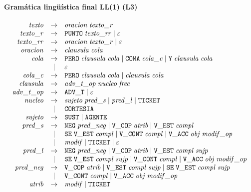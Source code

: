 \paragraph{Gramática lingüística final LL(1) (L3)}
\[
\begin{array}{rcl}
  \mathit{texto} & \to & \mathit{oracion}\;\mathit{texto\_r} \\
  \mathit{texto\_r} & \to & \mathtt{PUNTO}\;\mathit{texto\_rr} \mid \varepsilon \\
  \mathit{texto\_rr} & \to & \mathit{oracion}\;\mathit{texto\_r} \mid \varepsilon \\
  \mathit{oracion} & \to & \mathit{clausula}\;\mathit{cola} \\
  \mathit{cola} & \to & \mathtt{PERO}\;\mathit{clausula}\;\mathit{cola} \mid \mathtt{COMA}\;\mathit{cola\_c} \mid \mathtt{Y}\;\mathit{clausula}\;\mathit{cola} \\
   & \mid & \varepsilon \\
  \mathit{cola\_c} & \to & \mathtt{PERO}\;\mathit{clausula}\;\mathit{cola} \mid \mathit{clausula}\;\mathit{cola} \\
  \mathit{clausula} & \to & \mathit{adv\_t\_op}\;\mathit{nucleo}\;\mathit{frec} \\
  \mathit{adv\_t\_op} & \to & \mathtt{ADV\_T} \mid \varepsilon \\
  \mathit{nucleo} & \to & \mathit{sujeto}\;\mathit{pred\_s} \mid \mathit{pred\_l} \mid \mathtt{TICKET} \\
   & \mid & \mathtt{CORTESIA} \\
  \mathit{sujeto} & \to & \mathtt{SUST} \mid \mathtt{AGENTE} \\
  \mathit{pred\_s} & \to & \mathtt{NEG}\;\mathit{pred\_neg} \mid \mathtt{V\_COP}\;\mathit{atrib} \mid \mathtt{V\_EST}\;\mathit{compl} \\
   & \mid & \mathtt{SE}\;\mathtt{V\_EST}\;\mathit{compl} \mid \mathtt{V\_CONT}\;\mathit{compl} \mid \mathtt{V\_ACC}\;\mathit{obj}\;\mathit{modif\_op} \\
   & \mid & \mathit{modif} \mid \mathtt{TICKET} \mid \varepsilon \\
  \mathit{pred\_l} & \to & \mathtt{NEG}\;\mathit{pred\_neg} \mid \mathtt{V\_COP}\;\mathit{atrib} \mid \mathtt{V\_EST}\;\mathit{compl}\;\mathit{sujp} \\
   & \mid & \mathtt{SE}\;\mathtt{V\_EST}\;\mathit{compl}\;\mathit{sujp} \mid \mathtt{V\_CONT}\;\mathit{compl} \mid \mathtt{V\_ACC}\;\mathit{obj}\;\mathit{modif\_op} \\
  \mathit{pred\_neg} & \to & \mathtt{V\_COP}\;\mathit{atrib} \mid \mathtt{V\_EST}\;\mathit{compl}\;\mathit{sujp} \mid \mathtt{SE}\;\mathtt{V\_EST}\;\mathit{compl}\;\mathit{sujp} \\
   & \mid & \mathtt{V\_CONT}\;\mathit{compl} \mid \mathtt{V\_ACC}\;\mathit{obj}\;\mathit{modif\_op} \\
  \mathit{atrib} & \to & \mathit{modif} \mid \mathtt{TICKET} \\

\end{array}\]
